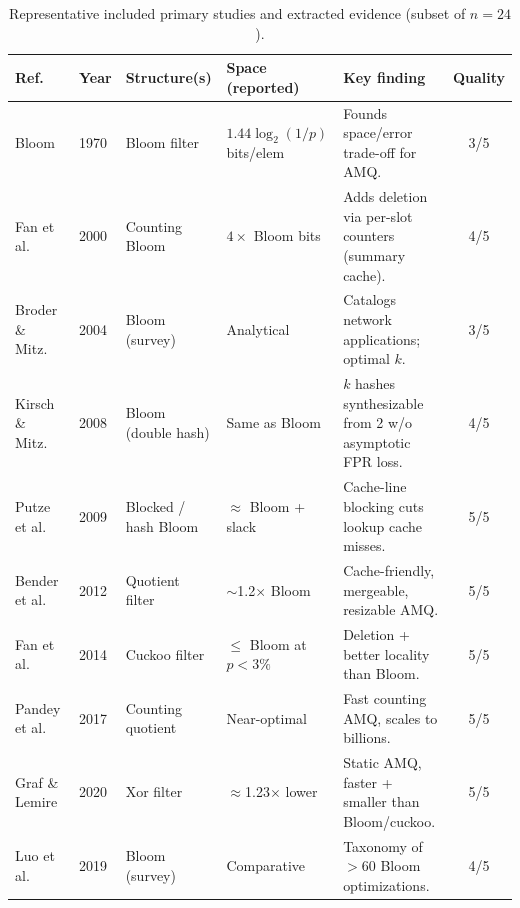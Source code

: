 \documentclass[conference]{IEEEtran}
\begin{document}
\begin{table}[!t]
\caption{Representative included primary studies and extracted evidence (subset of $n{=}24$).}
\label{tab:studies}
\centering
\renewcommand{\arraystretch}{1.2}
\footnotesize
\begin{tabular}{@{}llp{2.6cm}p{3.0cm}p{3.4cm}c@{}}
\toprule
\textbf{Ref.} & \textbf{Year} & \textbf{Structure(s)} & \textbf{Space (reported)} &
\textbf{Key finding} & \textbf{Quality} \\
\midrule
Bloom~\cite{bloom1970}            & 1970 & Bloom filter            & $1.44\log_2(1/p)$ bits/elem  & Founds space/error trade-off for AMQ.                       & 3/5 \\
Fan et al.~\cite{fan2000summary}  & 2000 & Counting Bloom          & $4\times$ Bloom bits         & Adds deletion via per-slot counters (summary cache).       & 4/5 \\
Broder \& Mitz.~\cite{broder2004network} & 2004 & Bloom (survey)   & Analytical                   & Catalogs network applications; optimal $k$.                & 3/5 \\
Kirsch \& Mitz.~\cite{kirsch2008less} & 2008 & Bloom (double hash) & Same as Bloom              & $k$ hashes synthesizable from 2 w/o asymptotic FPR loss.   & 4/5 \\
Putze et al.~\cite{putze2009cache}& 2009 & Blocked / hash Bloom    & $\approx$ Bloom + slack      & Cache-line blocking cuts lookup cache misses.              & 5/5 \\
Bender et al.~\cite{bender2012dont}& 2012 & Quotient filter        & $\sim$1.2$\times$ Bloom      & Cache-friendly, mergeable, resizable AMQ.                  & 5/5 \\
Fan et al.~\cite{fan2014cuckoo}   & 2014 & Cuckoo filter           & $\le$ Bloom at $p{<}3\%$     & Deletion + better locality than Bloom.                     & 5/5 \\
Pandey et al.~\cite{pandey2017counting}& 2017 & Counting quotient   & Near-optimal                 & Fast counting AMQ, scales to billions.                     & 5/5 \\
Graf \& Lemire~\cite{graf2020xor} & 2020 & Xor filter              & $\approx$1.23$\times$ lower  & Static AMQ, faster + smaller than Bloom/cuckoo.            & 5/5 \\
Luo et al.~\cite{luo2019optimizing}& 2019 & Bloom (survey)         & Comparative                  & Taxonomy of $>$60 Bloom optimizations.                     & 4/5 \\
\bottomrule
\end{tabular}
\end{table}
\end{document}
